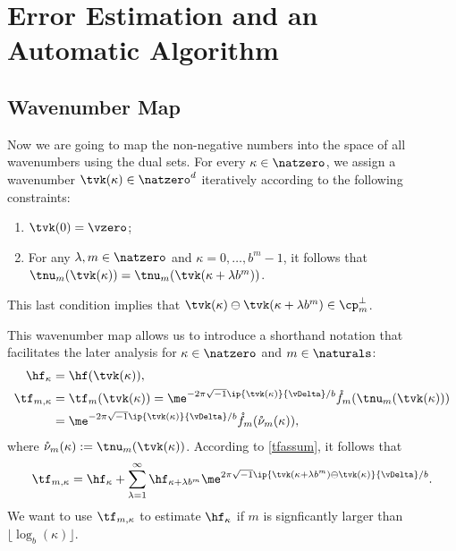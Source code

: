 \documentclass[]{elsarticle}
\theoremstyle{definition}
\renewcommand{\bbK}{\natzero^d}
\newcommand{\rf}{\mathring{f}}
\newcommand{\rnu}{\mathring{\nu}}
\begin{document}
\section{Error Estimation and an Automatic Algorithm}

\subsection{Wavenumber Map}

Now we are going to map the non-negative numbers into the space of all wavenumbers using the dual sets.  For every $\kappa \in \natzero$, we assign a wavenumber $\tvk(\kappa) \in \bbK$ iteratively according to the following constraints: 
\begin{enumerate}
\renewcommand{\labelenumi}{\roman{enumi})}

\item $\tvk(0)= \vzero$;

\item For any $\lambda, m \in \natzero$ and $\kappa=0, \ldots, b^m-1$, it follows that  $\tnu_m(\tvk(\kappa))=\tnu_m(\tvk(\kappa+\lambda b^m))$.

\end{enumerate}
This last condition implies that $\tvk(\kappa) \ominus \tvk(\kappa+\lambda b^m) \in \cp_m^{\perp}$.

This wavenumber map allows us to introduce a shorthand notation that facilitates the later analysis for $\kappa \in \natzero$ and $m \in \naturals$:
\begin{align*}
\hf_{\kappa} & =\hf(\tvk(\kappa)), \\
\tf_{m,\kappa}& = \tf_m(\tvk(\kappa))= \me^{-2 \pi \sqrt{-1} \ip{\tvk(\kappa)}{\vDelta}/b} \rf_m(\tnu_m(\tvk(\kappa)))\\
&= \me^{-2 \pi \sqrt{-1} \ip{\tvk(\kappa)}{\vDelta}/b} \rf_m(\rnu_m(\kappa)),
\end{align*}
where $\rnu_m(\kappa):=\tnu_m(\tvk(\kappa))$. According to \eqref{tfassum}, it follows that 
\begin{equation}
\tf_{m,\kappa} = \hf_{\kappa} + \sum_{\lambda=1}^{\infty} \hf_{\kappa+\lambda b^{m}} \me^{2 \pi \sqrt{-1} \ip{\tvk(\kappa+\lambda b^{m}) \ominus \tvk(\kappa)}{\vDelta}/b}.
\label{tfassumc}
\end{equation}
We want to use $\tf_{m,\kappa}$ to estimate $\hf_{\kappa}$ if $m$ is signficantly larger than $\lfloor \log_b(\kappa) \rfloor$.
\end{document}
